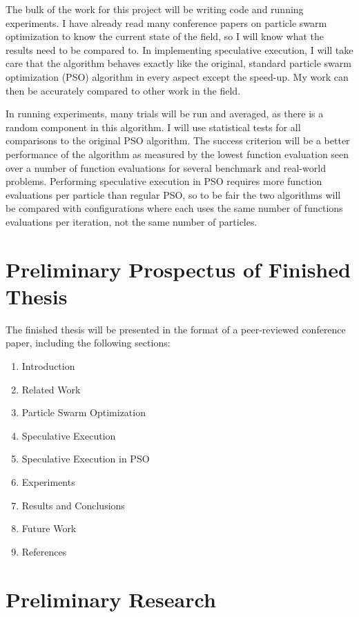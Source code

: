 \documentclass[onecolumn, 12pt]{article}
\begin{document}
The bulk of the work for this project will be writing code and running
experiments.  I have already read many conference papers on particle swarm
optimization to know the current state of the field, so I will know what the
results need to be compared to.  In implementing speculative execution, I will
take care that the algorithm behaves exactly like the original, standard
particle swarm optimization (PSO) algorithm in every aspect except the
speed-up.  My work can then be accurately compared to other work in the field.

In running experiments, many trials will be run and averaged, as there is a
random component in this algorithm.  I will use statistical tests for all
comparisons to the original PSO algorithm.  The success criterion will be a
better performance of the algorithm as measured by the lowest function
evaluation seen over a number of function evaluations for several benchmark and
real-world problems.  Performing speculative execution in PSO requires more
function evaluations per particle than regular PSO, so to be fair the two
algorithms will be compared with configurations where each uses the same number
of functions evaluations per iteration, not the same number of particles.

\section{Preliminary Prospectus of Finished Thesis}

The finished thesis will be presented in the format of a peer-reviewed
conference paper, including the following sections:

\begin{enumerate}
\item Introduction
\item Related Work
\item Particle Swarm Optimization
\item Speculative Execution
\item Speculative Execution in PSO
\item Experiments
\item Results and Conclusions
\item Future Work
\item References
\end{enumerate}

\section{Preliminary Research}
\end{document}
